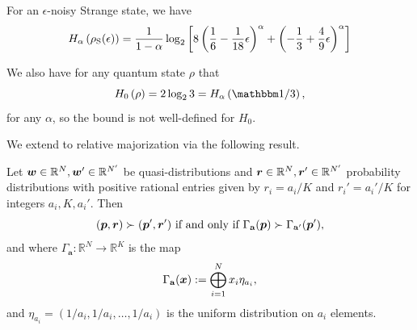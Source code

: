 \documentclass[pra,
aps,
twocolumn,
superscriptaddress,
groupedaddress,
nofootinbib,
reprint
]{revtex4-1}
\begin{document}
For an $\epsilon$-noisy Strange state, we have
\begin{equation}
	H_{\alpha}\left(\rho_{\rm{S}}(\epsilon)\right) = \frac{1}{1-\alpha}\log_2 \left[ 8\left( \frac{1}{6} - \frac{1}{18}\epsilon \right)^\alpha + \left(-\frac{1}{3} + \frac{4}{9}\epsilon \right)^\alpha \right]
\end{equation}
\ddd{[TO DO: Set $\epsilon = 0$ and determine region of $\alpha$ such that $H <0$.]}

We also have for any quantum state $\rho$ that
\begin{equation}
	H_{0}\left(\rho\right) = 2\log_2 3 = H_\alpha \left( \id/3 \right),
\end{equation}
for any $\alpha$, so the bound is not well-defined for $H_0$.

We extend to relative majorization via the following result.
\begin{lemma}Let $\boldsymbol{w}\in \mathbb{R}^N, \boldsymbol{w}'\in \mathbb{R}^{N'}$ be quasi-distributions and $\boldsymbol{r}\in \mathbb{R}^N, \boldsymbol{r}'\in \mathbb{R}^{N'}$ probability distributions with positive rational entries given by $r_i = a_i/K$ and $r_i' = a_i'/K$ for integers $a_i,K, a_i'$. Then
\begin{equation}
(\boldsymbol{p}, \boldsymbol{r}) \succ (\boldsymbol{p}', \boldsymbol{r}') \mbox{ if and only if } \Gamma_{\mathbf{a}} (\boldsymbol{p}) \succ \Gamma_{\mathbf{a}'} (\boldsymbol{p}'),
\end{equation}
and where $\Gamma_{\mathbf{a}} :\mathbb{R}^N \rightarrow \mathbb{R}^K$ is the map
\begin{equation}
\Gamma_{\mathbf{a}}(\boldsymbol{x}) := \bigoplus_{i=1}^N x_i \eta_{a_i},
\end{equation}
and $\eta_{a_i} = (1/a_i, 1/a_i, \dots, 1/a_i)$ is the uniform distribution on $a_i$ elements.
\end{lemma}
\end{document}
